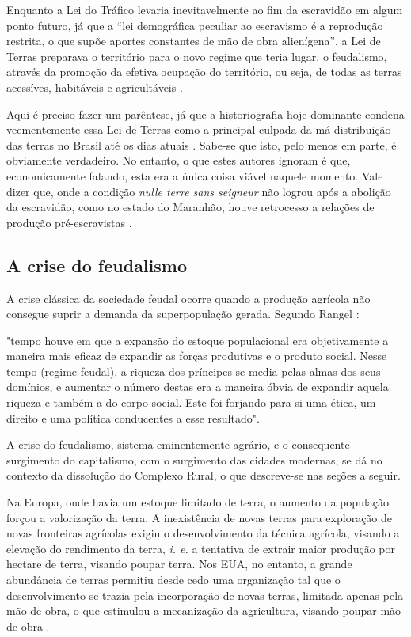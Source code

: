 \documentclass[
	12pt,				%
	oneside,			%
	a4paper,			%
	chapter=TITLE,		%
	section=TITLE,		%
	english,			%
	brazil				%
	]{abntex2}
\begin{document}
\begin{refsection}
Enquanto a Lei do Tráfico levaria inevitavelmente ao fim da escravidão em algum
ponto futuro, já que a ``lei demográfica peculiar ao escravismo é a reprodução
restrita, o que supõe aportes constantes de mão de obra alienígena'', a Lei de
Terras preparava o território para o novo regime que teria lugar, o feudalismo,
através da promoção da efetiva ocupação do território, ou seja, de todas as
terras acessíves, habitáveis e agricultáveis \autocite[732-733]{rangel1989}.

Aqui é preciso fazer um parêntese, já que a historiografia hoje dominante
condena veementemente essa Lei de Terras como a principal culpada da má
distribuição das terras no Brasil até os dias atuais \autocite[ver][p.
47-48]{accioly2018}. Sabe-se que isto, pelo menos em parte, é obviamente verdadeiro. No
entanto, o que estes autores ignoram é que, economicamente falando, esta era a
única coisa viável naquele momento. Vale dizer que, onde a condição \emph{nulle terre
sans seigneur} não logrou após a abolição da escravidão, como no estado do
Maranhão, houve retrocesso a relações de produção pré-escravistas \autocite[
733-734]{rangel1989}.

\hypertarget{a-crise-do-feudalismo}{%
\subsection{A crise do feudalismo}\label{a-crise-do-feudalismo}}

A crise clássica da sociedade feudal ocorre quando a produção agrícola não
consegue suprir a demanda da superpopulação gerada. Segundo Rangel
\autocite*[219]{rangel1961}:
\begin{citacao} 
"tempo houve em que a expansão do estoque populacional era objetivamente a
maneira mais eficaz de expandir as forças produtivas e o produto social. Nesse
tempo (regime feudal), a riqueza dos príncipes se media pelas almas dos seus
domínios, e aumentar o número destas era a maneira óbvia de expandir aquela
riqueza e também a do corpo social. Este foi forjando para si uma ética, um
direito e uma política conducentes a esse resultado".
\end{citacao}
A crise do feudalismo, sistema eminentemente agrário, e o consequente surgimento
do capitalismo, com o surgimento das cidades modernas, se dá no contexto da
dissolução do Complexo Rural, o que descreve-se nas seções a seguir.

Na Europa, onde havia um estoque limitado de terra, o aumento da população
forçou a valorização da terra. A inexistência de novas terras para exploração de
novas fronteiras agrícolas exigiu o desenvolvimento da técnica agrícola, visando
a elevação do rendimento da terra, \emph{i. e.} a tentativa de extrair maior
produção por hectare de terra, visando poupar terra. Nos \gls{EUA}, no entanto,
a grande abundância de terras permitiu desde cedo uma organização tal que o
desenvolvimento se trazia pela incorporação de novas terras, limitada apenas
pela mão-de-obra, o que estimulou a mecanização da agricultura, visando poupar
mão-de-obra \autocite[p.227]{furtado2009}.


\end{refsection}
\end{document}
